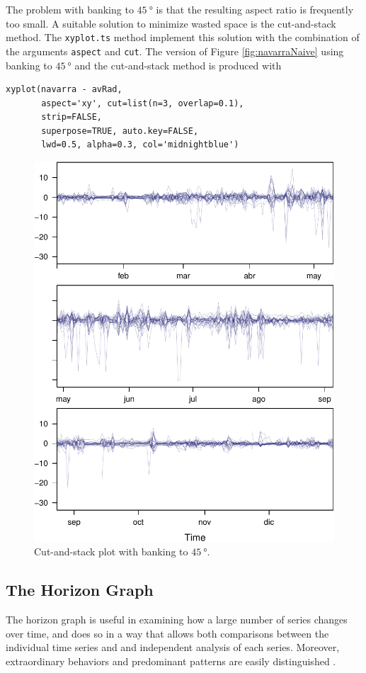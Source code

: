 \documentclass[smallroyalvopaper]{memoir}
\begin{document}
The problem with banking to $\SI{45}{\degree}$ is that the resulting
aspect ratio is frequently too small. A suitable solution to
minimize wasted space is the cut-and-stack method. The \texttt{xyplot.ts}
method implement this solution with the combination of the
arguments \texttt{aspect} and \texttt{cut}. The version of Figure
\ref{fig:navarraNaive} using banking to $\SI{45}{\degree}$ and the
cut-and-stack method is produced with
\lstset{language=R,numbers=none}
\begin{lstlisting}
xyplot(navarra - avRad,
       aspect='xy', cut=list(n=3, overlap=0.1),
       strip=FALSE,
       superpose=TRUE, auto.key=FALSE,
       lwd=0.5, alpha=0.3, col='midnightblue')
\end{lstlisting}

\begin{figure}[htb]
\centering
\includegraphics[width=.9\linewidth]{figs/navarraBanking.pdf}
\caption{\label{fig:navarraBanking}Cut-and-stack plot with banking to $\SI{45}{\degree}$.}
\end{figure}
\subsection{The Horizon Graph}
\label{sec-2-2}
The horizon graph is useful in examining how a
large number of series changes over time, and does so in a way
that allows both comparisons between the individual time series
and and independent analysis of each series. Moreover,
extraordinary behaviors and predominant patterns are easily
distinguished \cite{Heer.Kong.ea2009, Few2008}.
\end{document}
